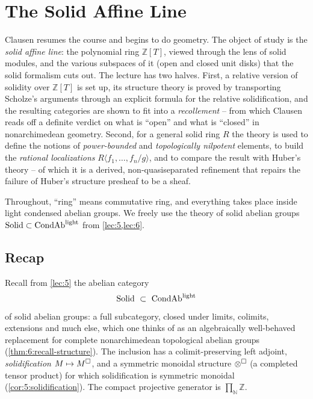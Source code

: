 \section{The Solid Affine Line}
\label{lec:7}

Clausen resumes the course and begins to do geometry. The object of study is
the \emph{solid affine line}: the polynomial ring $\mathbb{Z}[T]$, viewed
through the lens of solid modules, and the various subspaces of it (open and
closed unit disks) that the solid formalism cuts out. The lecture has two
halves. First, a relative version of solidity over $\mathbb{Z}[T]$ is set up,
its structure theory is proved by transporting Scholze's arguments through an
explicit formula for the relative solidification, and the resulting
categories are shown to fit into a \emph{recollement}
-- from which Clausen reads off a definite verdict on what is ``open'' and
what is ``closed'' in nonarchimedean geometry. Second, for a general solid
ring $R$ the theory is used to define the notions of \emph{power-bounded} and
\emph{topologically nilpotent} elements, to build the \emph{rational
localizations} $R\langle f_1,\dots,f_n/g\rangle$, and to compare the result
with Huber's theory -- of which it is a derived, non-quasiseparated
refinement that repairs the failure of Huber's structure presheaf to be a
sheaf.

Throughout, ``ring'' means commutative ring, and everything takes place inside
light condensed abelian groups. We freely use the theory of solid abelian
groups $\mathrm{Solid}\subset\mathrm{CondAb}^{\mathrm{light}}$ from \cref{lec:5,lec:6}.

\subsection{Recap}

Recall from \cref{lec:5} the abelian category
\begin{equation*}
\mathrm{Solid}\ \subset\ \mathrm{CondAb}^{\mathrm{light}}
\end{equation*}
of solid abelian groups: a full subcategory, closed under limits, colimits,
extensions and much else, which one thinks of as an algebraically well-behaved
replacement for complete nonarchimedean topological abelian groups
(\cref{thm:6:recall-structure}). The inclusion has a colimit-preserving left
adjoint, \emph{solidification} $M\mapsto M^{\square}$, and a symmetric monoidal
structure $\otimes^{\square}$ (a completed tensor product) for which
solidification is symmetric monoidal (\cref{cor:5:solidification}). The
compact projective generator is $\prod_{\mathbb{N}}\mathbb{Z}$.

